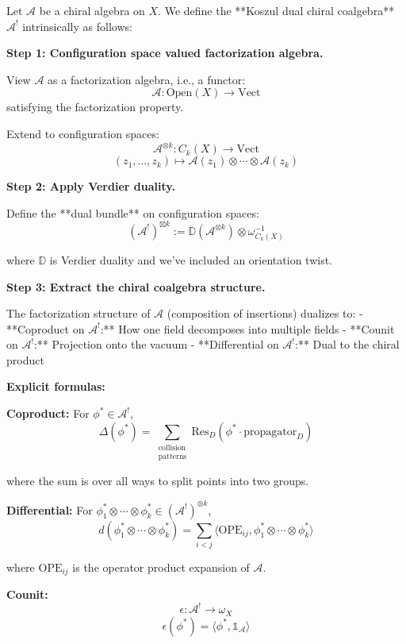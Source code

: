 \begin{construction}\label{const:A-dual-intrinsic}
Let $\mathcal{A}$ be a chiral algebra on $X$. We define the **Koszul dual chiral coalgebra** $\mathcal{A}^!$ intrinsically as follows:

\textbf{Step 1: Configuration space valued factorization algebra.}

View $\mathcal{A}$ as a factorization algebra, i.e., a functor:
$$\mathcal{A}: \text{Open}(X) \to \text{Vect}$$
satisfying the factorization property.

Extend to configuration spaces:
$$\mathcal{A}^{\otimes k}: C_k(X) \to \text{Vect}$$
$$(z_1, \ldots, z_k) \mapsto \mathcal{A}(z_1) \otimes \cdots \otimes \mathcal{A}(z_k)$$

\textbf{Step 2: Apply Verdier duality.}

Define the **dual bundle** on configuration spaces:
$$(\mathcal{A}^!)^{\boxtimes k} := \mathbb{D}\left(\mathcal{A}^{\otimes k}\right) \otimes \omega_{C_k(X)}^{-1}$$

where $\mathbb{D}$ is Verdier duality and we've included an orientation twist.

\textbf{Step 3: Extract the chiral coalgebra structure.}

The factorization structure of $\mathcal{A}$ (composition of insertions) dualizes to:
- **Coproduct on $\mathcal{A}^!$:** How one field decomposes into multiple fields
- **Counit on $\mathcal{A}^!$:** Projection onto the vacuum
- **Differential on $\mathcal{A}^!$:** Dual to the chiral product

\textbf{Explicit formulas:}

\textbf{Coproduct:} For $\phi^* \in \mathcal{A}^!$,
$$\Delta(\phi^*) = \sum_{\substack{\text{collision}\\\text{patterns}}} \text{Res}_{D}(\phi^* \cdot \text{propagator}_{D})$$

where the sum is over all ways to split points into two groups.

\textbf{Differential:} For $\phi^*_1 \otimes \cdots \otimes \phi^*_k \in (\mathcal{A}^!)^{\otimes k}$,
$$d(\phi^*_1 \otimes \cdots \otimes \phi^*_k) = \sum_{i<j} \langle \text{OPE}_{ij}, \phi^*_1 \otimes \cdots \otimes \phi^*_k \rangle$$

where $\text{OPE}_{ij}$ is the operator product expansion of $\mathcal{A}$.

\textbf{Counit:}
$$\epsilon: \mathcal{A}^! \to \omega_X$$
$$\epsilon(\phi^*) = \langle \phi^*, \mathbb{1}_{\mathcal{A}} \rangle$$
\end{construction}

